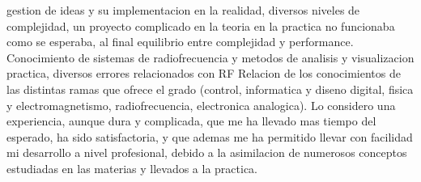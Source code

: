 gestion de ideas y su implementacion en la realidad, diversos niveles de complejidad, un proyecto complicado en la teoria en la practica no funcionaba como se esperaba, al final equilibrio entre complejidad y performance.
Conocimiento de sistemas de radiofrecuencia y metodos de analisis y visualizacion practica, diversos errores relacionados con RF 
Relacion de los conocimientos de las distintas ramas que ofrece el grado (control, informatica y diseno digital, fisica y electromagnetismo, radiofrecuencia, electronica analogica).
Lo considero una experiencia, aunque dura y complicada, que me ha llevado mas tiempo del esperado, ha sido satisfactoria, y que ademas me ha permitido llevar con facilidad mi desarrollo a nivel profesional, debido a la asimilacion de numerosos conceptos estudiadas en las materias y llevados a la practica.
